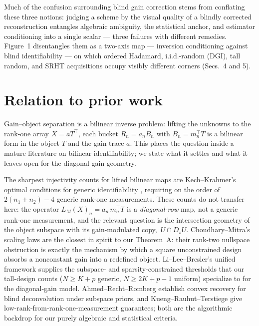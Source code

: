 Much of the confusion surrounding blind gain correction stems from conflating these three notions: judging a scheme by the visual quality of a blindly corrected reconstruction entangles algebraic ambiguity, the statistical anchor, and estimator conditioning into a single scalar --- three failures with different remedies. Figure~1 disentangles them as a two-axis map --- inversion conditioning against blind identifiability --- on which ordered Hadamard, i.i.d.-random (DGI), tall random, and SRHT acquisitions occupy visibly different corners (Secs.~4 and 5).

\section{Relation to prior work}

Gain--object separation is a bilinear inverse problem: lifting the unknowns to the rank-one array $X=aT^{\top}$, each bucket $R_n=a_n B_n$ with $B_n=m_n^{\top}T$ is a bilinear form in the object $T$ and the gain trace $a$. This places the question inside a mature literature on bilinear identifiability; we state what it settles and what it leaves open for the diagonal-gain geometry.

The sharpest injectivity counts for lifted bilinear maps are Kech--Krahmer's optimal conditions for generic identifiability \cite{KechKrahmer1603.07316}, requiring on the order of $2(n_1+n_2)-4$ generic rank-one measurements. These counts do not transfer here: the operator $L_M(X)_n=a_n\,m_n^{\top}T$ is a \emph{diagonal-row} map, not a generic rank-one measurement, and the relevant question is the intersection geometry of the object subspace with its gain-modulated copy, $\,U\cap D_sU$. Choudhary--Mitra's scaling laws \cite{ChoudharyMitra1402.2637} are the closest in spirit to our Theorem~A: their rank-two nullspace obstruction is exactly the mechanism by which a square unconstrained design absorbs a nonconstant gain into a redefined object. Li--Lee--Bresler's unified framework \cite{LiLeeBresler1501.06120} supplies the subspace- and sparsity-constrained thresholds that our tall-design counts ($N\ge K+p$ generic, $N\ge 2K+p-1$ uniform) specialize to for the diagonal-gain model. Ahmed--Recht--Romberg \cite{AhmedRechtRomberg1211.5608} establish convex recovery for blind deconvolution under subspace priors, and Kueng--Rauhut--Terstiege \cite{KuengRauhutTerstiege1410.6913} give low-rank-from-rank-one-measurement guarantees; both are the algorithmic backdrop for our purely algebraic and statistical criteria.

